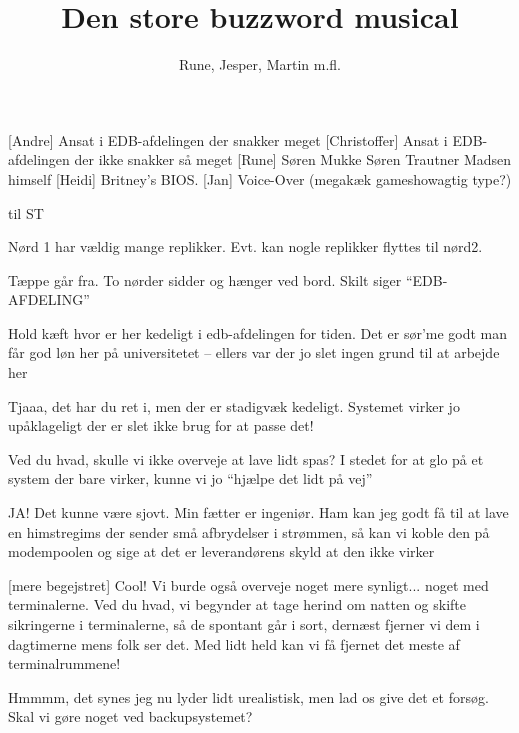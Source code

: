 \documentclass[danish]{article}
\title{Den store buzzword musical}
\author{Rune, Jesper, Martin m.fl.}
\begin{document}
\maketitle

\begin{roles}
  [Andre] Ansat i EDB-afdelingen der snakker meget
  [Christoffer] Ansat i EDB-afdelingen der ikke snakker så meget
  [Rune] Søren Mukke
   Søren Trautner Madsen himself
  [Heidi] Britney's BIOS. 
  [Jan] Voice-Over (megakæk gameshowagtig type?)
\end{roles}

\begin{props}
   til ST
\end{props}

\begin{sketch}
  
\scene Nørd 1 har vældig mange replikker. Evt. kan nogle replikker flyttes til
nørd2.
  
\scene Tæppe går fra. To nørder sidder og hænger ved bord. Skilt siger
``EDB-AFDELING''

 Hold kæft hvor er her kedeligt i edb-afdelingen for tiden. Det er
sør'me godt man får god løn her på universitetet -- ellers var der jo slet ingen
grund til at arbejde her

 Tjaaa, det har du ret i, men der er stadigvæk kedeligt. Systemet
virker jo upåklageligt  der er slet ikke brug for at passe det!

 Ved du hvad, skulle vi ikke overveje at lave lidt spas? I stedet
for at glo på et system der bare virker, kunne vi jo ``hjælpe det lidt på vej''

 JA! Det kunne være sjovt. Min fætter er ingeniør. Ham kan jeg godt
få til at lave en himstregims der sender små afbrydelser i strømmen, så kan vi
koble den på modempoolen og sige at det er leverandørens skyld at den ikke
virker

[mere begejstret] Cool! Vi burde også overveje noget mere synligt...
noget med terminalerne. Ved du hvad, vi begynder at tage herind om natten og
skifte sikringerne i terminalerne, så de spontant går i sort, dernæst fjerner vi
dem i dagtimerne mens folk ser det. Med lidt held kan vi få fjernet det meste af
terminalrummene!

 Hmmmm, det synes jeg nu lyder lidt urealistisk, men lad os give det
et forsøg. Skal vi gøre noget ved backupsystemet?


\end{sketch}
\end{document}
